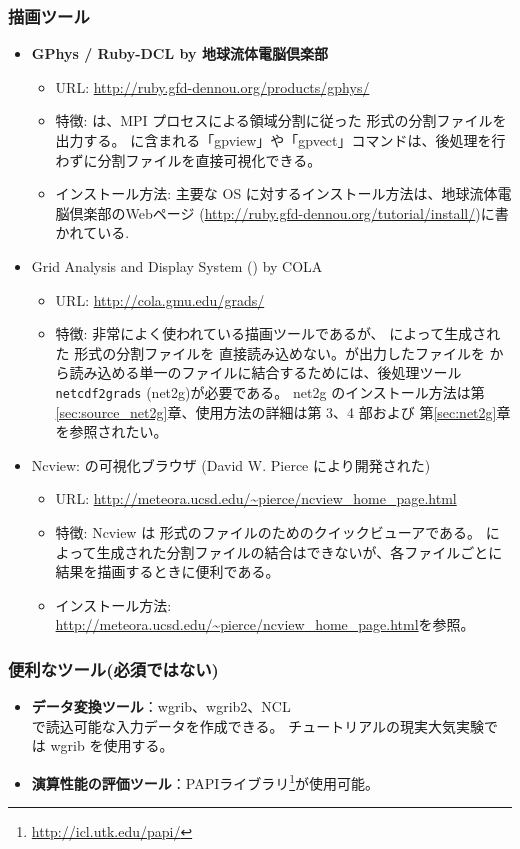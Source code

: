 \subsubsection{\bf 描画ツール}
\begin{itemize}
  \item {\bf GPhys / Ruby-DCL by 地球流体電脳倶楽部}
  \begin{itemize}
    \item URL: \url{http://ruby.gfd-dennou.org/products/gphys/}
    \item 特徴: {\scalelib}は、MPI プロセスによる領域分割に従った {\netcdf} 形式の分割ファイルを出力する。
    {\gphys}に含まれる「gpview」や「gpvect」コマンドは、後処理を行わずに分割ファイルを直接可視化できる。
    \item インストール方法: 主要な OS に対するインストール方法は、地球流体電脳倶楽部のWebページ
    (\url{http://ruby.gfd-dennou.org/tutorial/install/})に書かれている.
  \end{itemize}
  \item Grid Analysis and Display System ({\grads}) by COLA
  \begin{itemize}
    \item URL: \url{http://cola.gmu.edu/grads/}
    \item 特徴: 非常によく使われている描画ツールであるが、 \scalelib によって生成された {\netcdf}形式の分割ファイルを
    直接読み込めない。\scalelib が出力したファイルを {\grads} から読み込める単一のファイルに結合するためには、後処理ツール \verb|netcdf2grads| (net2g)が必要である。
    net2g のインストール方法は第\ref{sec:source_net2g}章、使用方法の詳細は第 3、4 部および
    第\ref{sec:net2g}章を参照されたい。
 \end{itemize}
 \item Ncview: {\netcdf} の可視化ブラウザ (David W. Pierce により開発された)
  \begin{itemize}
  \item URL: \url{http://meteora.ucsd.edu/~pierce/ncview_home_page.html}
  \item 特徴: Ncview は {\netcdf}形式のファイルのためのクイックビューアである。
  \scalelib によって生成された分割ファイルの結合はできないが、各ファイルごとに結果を描画するときに便利である。
  \item インストール方法: \url{http://meteora.ucsd.edu/~pierce/ncview_home_page.html}を参照。
 \end{itemize}
\end{itemize}

\subsubsection{\bf 便利なツール(必須ではない)}
\begin{itemize}
  \item {\bf データ変換ツール}：wgrib、wgrib2、NCL \\
  \scalerm で読込可能な入力データを作成できる。
  チュートリアルの現実大気実験では wgrib を使用する。
  \item {\bf 演算性能の評価ツール}：PAPIライブラリ\footnote{\url{http://icl.utk.edu/papi/}}が使用可能。
\end{itemize}
